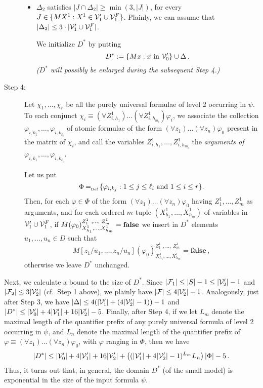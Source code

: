 \documentclass{fundam}
\newcommand{\false}{\mathbf{false}}
\newcommand{\defAs}
   {\mbox{$\:= \! \! \raisebox{-0.5 ex}[0 ex][0 ex]{\tiny Def}\:$}}
\begin{document}
\begin{description}
\begin{itemize}
\item $\Delta_{2}$ satisfies $|J \cap \Delta_{2}| \geq \min(3, |J|)$,
for every $J \in \{MX^1 : X^1 \in {\cal V}_1'\cup {\cal V}_1^F\}$.
Plainly, we can assume that $|\Delta_{2}| \leq 3 \cdot |{\cal
V}_1'\cup {\cal V}_1^F|$.

We initialize $D^*$ by putting
$$
D^* :=\{Mx : x \hbox{ in } {\cal V}_0'\} \cup \Delta\,.
$$
\emph{($D^*$ will possibly be enlarged during the subsequent Step 4.)}
\end{itemize}

\item [Step 4:] Let $\chi_1, \ldots , \chi_r$ be all the purely universal
formulae of level 2 occurring in $\psi$. To each conjunct
$\chi_i \equiv (\forall Z_{i,h_1}^{1})
\ldots (\forall Z_{i,h_{m_i}}^{1}) \varphi_i$, we associate the
collection $\varphi_{i,k_1}, \ldots , \varphi_{i,k_{\ell_i}}$ of atomic
formulae of the form $(\forall z_1) \ldots (\forall z_n) \varphi_0$
present in the matrix of $\chi_i$, and call the variables
$Z_{i,h_1}^{1}, \ldots , Z_{i,h_{m_i}}^{1}$ the {\em arguments of }
$\varphi_{i,k_{1}}, \ldots , \varphi_{i,k_{\ell_i}}$.

Let us put
$$
\Phi \defAs \{ \varphi_{i,k_j} : 1 \leq j  \leq \ell_i \hbox{ and }
 1 \leq i \leq r  \}.
$$
Then, for each $\varphi \in \Phi$ of the form $(\forall z_1) \ldots
(\forall z_n) \varphi_0$ having $Z_1^{1},\ldots,Z_m^{1}$ as arguments,
and for each ordered $m$-tuple $(X_{h_1}^{1},\ldots,X_{h_m}^{1})$ of
variables in ${\cal V}_1'\cup {\cal V}_1^F$, if
$M({\varphi_{0}})_{X_{h_1}^{1},\ldots,X_{h_m}^{1}}^{Z_1^{1}\;\,,\ldots,\;Z_m^{1}}
= \hbox{\bf false}$ we insert in $D^*$ elements $u_1,\ldots,u_n \in D$
such that
$$M[z_1/u_1,\ldots,z_n/u_n]
(\varphi_{0})_{X_{h_1}^{1},\ldots,X_{h_m}^{1}}^{Z_1^{1}\;\,,\ldots,\;Z_m^{1}}
=\false\,,$$ otherwise we leave $D^*$ unchanged.
\end{description}

Next, we calculate a bound to the size of $D^*$.  Since
$|\mathcal{F}_1| \leq |S| - 1 \leq |{\cal V}_2'|-1$ and
$|\mathcal{F}_2|\leq 3|{\cal V}_2'|$ (cf.\ Step 1 above), we plainly
have $|\mathcal{F}|\leq 4|{\cal V}_2'| - 1$.  Analogously, just after
Step 3, we have $|\Delta|\leq 4(|{\cal V}_1'| + (4|{\cal V}_2'| -1))
-1$ and $|D^*| \leq |{\cal V}_0'| + 4|{\cal V}_1'| + 16|{\cal V}_2'|
-5$.  Finally, after Step 4, if we let $L_{m}$ denote the maximal
length of the quantifier prefix of any purely universal formula of
level 2 occurring in $\psi$, and $L_{n}$ denote the maximal length of
the quantifier prefix of $\varphi \equiv (\forall z_1)\ldots(\forall
z_n)\varphi_0$, with $\varphi$ ranging in $\Phi$, then we have
\begin{equation}
    \label{DStar}
    |D^*| \leq |{\cal V}_0'| + 4|{\cal V}_1'| + 16|{\cal V}_2'| +
    \left((|{\cal V}_1'| + 4|{\cal V}_2'| - 1)^{L_{m}} L_{n}\right)|\Phi| - 5\,.
\end{equation}
Thus, it turns out that, in general, the domain $D^*$ (of the small
model) is exponential in the size of the input formula $\psi$.
\end{document}
